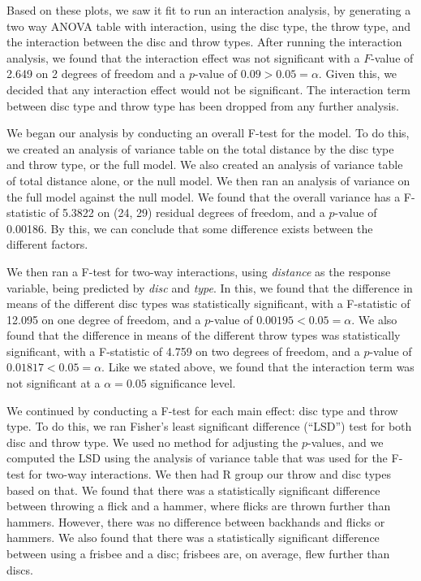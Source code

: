 \documentclass[letter,12pt]{article}
\begin{document}
  Based on these plots, we saw it fit to run an interaction analysis, by generating a two way ANOVA table with interaction, using the disc type, the throw type, and the interaction between the disc and throw types. After running the interaction analysis, we found that the interaction effect was not significant with a $F$-value of 2.649 on 2 degrees of freedom and a $p$-value of $0.09 > 0.05 = \alpha$. Given this, we decided that any interaction effect would not be significant. The interaction term between disc type and throw type has been dropped from any further analysis.\par
  We began our analysis by conducting an overall F-test for the model. To do this, we created an analysis of variance table on the total distance by the disc type and throw type, or the full model. We also created an analysis of variance table of total distance alone, or the null model. We then ran an analysis of variance on the full model against the null model. We found that the overall variance has a F-statistic of 5.3822 on (24, 29) residual degrees of freedom, and a $p$-value of 0.00186. By this, we can conclude that some difference exists between the different factors.\par
  We then ran a F-test for two-way interactions, using \textit{distance} as the response variable, being predicted by \textit{disc} and \textit{type}. In this, we found that the difference in means of the different disc types was statistically significant, with a F-statistic of 12.095 on one degree of freedom, and a $p$-value of $0.00195 < 0.05 = \alpha$. We also found that the difference in means of the different throw types was statistically significant, with a F-statistic of 4.759 on two degrees of freedom, and a $p$-value of $0.01817 < 0.05 = \alpha$. Like we stated above, we found that the interaction term was not significant at a $\alpha = 0.05$ significance level.\par
  We continued by conducting a F-test for each main effect: disc type and throw type. To do this, we ran Fisher’s least significant difference (“LSD”) test for both disc and throw type. We used no method for adjusting the $p$-values, and we computed the LSD using the analysis of variance table that was used for the F-test for two-way interactions. We then had R group our throw and disc types based on that. We found that there was a statistically significant difference between throwing a flick and a hammer, where flicks are thrown further than hammers. However, there was no difference between backhands and flicks or hammers. We also found that there was a statistically significant difference between using a frisbee and a disc; frisbees are, on average, flew further than discs.\par
	
\end{document}
